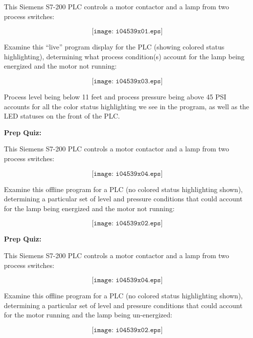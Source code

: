 

This Siemens S7-200 PLC controls a motor contactor and a lamp from two process switches:

$$\texttt{[image: i04539x01.eps]}$$

Examine this ``live'' program display for the PLC (showing colored status highlighting), determining what process condition(s) account for the lamp being energized and the motor not running:

$$\texttt{[image: i04539x03.eps]}$$







Process level being below 11 feet and process pressure being above 45 PSI accounts for all the color status highlighting we see in the program, as well as the LED statuses on the front of the PLC.







\vfil \eject

\noindent
{\bf Prep Quiz:}

This Siemens S7-200 PLC controls a motor contactor and a lamp from two process switches:

$$\texttt{[image: i04539x04.eps]}$$

Examine this offline program for a PLC (no colored status highlighting shown), determining a particular set of level and pressure conditions that could account for the lamp being energized and the motor not running:

$$\texttt{[image: i04539x02.eps]}$$


\vfil \eject

\noindent
{\bf Prep Quiz:}

This Siemens S7-200 PLC controls a motor contactor and a lamp from two process switches:

$$\texttt{[image: i04539x04.eps]}$$

Examine this offline program for a PLC (no colored status highlighting shown), determining a particular set of level and pressure conditions that could account for the motor running and the lamp being un-energized:

$$\texttt{[image: i04539x02.eps]}$$





